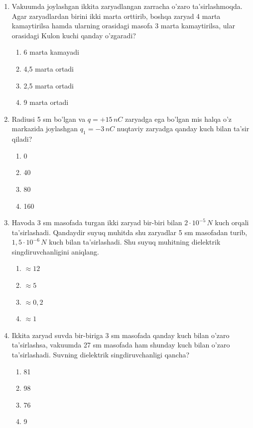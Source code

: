 \begin{enumerate}
\item Vakuumda joylashgan ikkita zaryadlangan zarracha o'zaro ta'sirlashmoqda. Agar zaryadlardan birini ikki marta orttirib, boshqa zaryad 4 marta kamaytirilsa hamda ularning orasidagi masofa 3 marta kamaytirilsa, ular orasidagi Kulon kuchi qanday o'zgaradi?
\begin{enumerate}[label=\Alph*)]
\item 6 marta kamayadi
\item 4,5 marta ortadi
\item 2,5 marta ortadi
\item 9 marta ortadi
\end{enumerate}

\item Radiusi 5 sm bo'lgan va $q = +15 \, nC$ zaryadga ega bo'lgan mis halqa o'z markazida joylashgan $q_1 = -3 \, nC$ nuqtaviy zaryadga qanday kuch bilan ta'sir qiladi?
\begin{enumerate}[label=\Alph*)]
\item 0
\item 40
\item 80
\item 160
\end{enumerate}

\item Havoda 3 sm masofada turgan ikki zaryad bir-biri bilan $2 \cdot 10^{-5} \, N$ kuch orqali ta'sirlashadi. Qandaydir suyuq muhitda shu zaryadlar 5 sm masofadan turib, $1,5 \cdot 10^{-6} \, N$ kuch bilan ta'sirlashadi. Shu suyuq muhitning dielektrik singdiruvchanligini aniqlang.
\begin{enumerate}[label=\Alph*)]
\item $\approx 12$
\item $\approx 5$
\item $\approx 0,2$
\item $\approx 1$
\end{enumerate}

\item Ikkita zaryad suvda bir-biriga 3 sm masofada qanday kuch bilan o'zaro ta'sirlashsa, vakuumda 27 sm masofada ham shunday kuch bilan o'zaro ta'sirlashadi. Suvning dielektrik singdiruvchanligi qancha?
\begin{enumerate}[label=\Alph*)]
\item 81
\item 98
\item 76
\item 9
\end{enumerate}


\end{enumerate}
